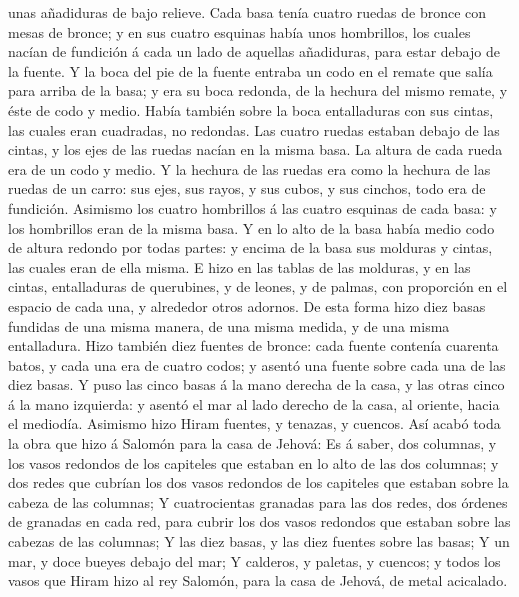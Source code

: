 unas añadiduras de bajo relieve.  Cada basa tenía cuatro
ruedas de bronce con mesas de bronce; y en sus cuatro esquinas había
unos hombrillos, los cuales nacían de fundición á cada un lado de
aquellas añadiduras, para estar debajo de la fuente.  Y
la boca del pie de la fuente entraba un codo en el remate que salía para
arriba de la basa; y era su boca redonda, de la hechura del mismo
remate, y éste de codo y medio. Había también sobre la boca entalladuras
con sus cintas, las cuales eran cuadradas, no redondas. 
Las cuatro ruedas estaban debajo de las cintas, y los ejes de las ruedas
nacían en la misma basa. La altura de cada rueda era de un codo y medio.
 Y la hechura de las ruedas era como la hechura de las
ruedas de un carro: sus ejes, sus rayos, y sus cubos, y sus cinchos,
todo era de fundición.  Asimismo los cuatro hombrillos á
las cuatro esquinas de cada basa: y los hombrillos eran de la misma
basa.  Y en lo alto de la basa había medio codo de altura
redondo por todas partes: y encima de la basa sus molduras y cintas, las
cuales eran de ella misma.  E hizo en las tablas de las
molduras, y en las cintas, entalladuras de querubines, y de leones, y de
palmas, con proporción en el espacio de cada una, y alrededor otros
adornos.  De esta forma hizo diez basas fundidas de una
misma manera, de una misma medida, y de una misma entalladura.
 Hizo también diez fuentes de bronce: cada fuente
contenía cuarenta batos, y cada una era de cuatro codos; y asentó una
fuente sobre cada una de las diez basas.  Y puso las
cinco basas á la mano derecha de la casa, y las otras cinco á la mano
izquierda: y asentó el mar al lado derecho de la casa, al oriente, hacia
el mediodía.  Asimismo hizo Hiram fuentes, y tenazas, y
cuencos. Así acabó toda la obra que hizo á Salomón para la casa de
Jehová:  Es á saber, dos columnas, y los vasos redondos
de los capiteles que estaban en lo alto de las dos columnas; y dos redes
que cubrían los dos vasos redondos de los capiteles que estaban sobre la
cabeza de las columnas;  Y cuatrocientas granadas para
las dos redes, dos órdenes de granadas en cada red, para cubrir los dos
vasos redondos que estaban sobre las cabezas de las columnas;
 Y las diez basas, y las diez fuentes sobre las basas;
 Y un mar, y doce bueyes debajo del mar; 
Y calderos, y paletas, y cuencos; y todos los vasos que Hiram hizo al
rey Salomón, para la casa de Jehová, de metal acicalado. 

